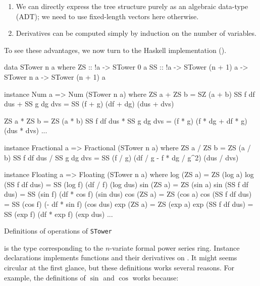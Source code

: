 \documentclass[./rims-smooth-paper.tex]{subfiles}
\begin{document}
\begin{enumerate}
\item We can directly express the tree structure purely as an algebraic data-type (ADT); we need to use fixed-length vectors here otherwise.\label{item:adt-friendly}
\item Derivatives can be computed simply by induction on the number of variables.\label{item:recurse}
\end{enumerate}

To see these advantages, we now turn to the Haskell implementation ().
\begin{listing}[tb]
\begin{code}
data STower n a where
  ZS :: !a -> STower 0 a
  SS :: !a -> STower (n + 1) a -> STower n a -> STower (n + 1) a

instance Num a => Num (STower n a) where
  ZS a + ZS b = SZ (a + b)
  SS f df dus + SS g dg dvs = SS (f + g) (df + dg) (dus + dvs)

  ZS a * ZS b = ZS (a * b)
  SS f df dus * SS g dg dvs = (f * g) (f * dg + df * g) (dus * dvs)
  ...

instance Fractional a => Fractional (STower n a) where
  ZS a / ZS b = ZS (a / b)
  SS f df dus / SS g dg dvs = SS (f / g) (df / g - f * dg / g^2) (dus / dvs)

instance Floating a => Floating (STower n a) where
  log (ZS a) = ZS (log a)
  log (SS f df dus) = SS (log f) (df / f) (log dus)
  sin (ZS a) = ZS (sin a)
  sin (SS f df dus) = SS (sin f) (df * cos f) (sin dus)
  cos (ZS a) = ZS (cos a)
  cos (SS f df dus) = SS (cos f) (- df * sin f) (cos dus)
  exp (ZS a) = ZS (exp a)
  exp (SS f df dus) = SS (exp f) (df * exp f) (exp dus)
  ...
\end{code}
\caption{Definitions of operations of \texttt{STower}\label{lst:ops-def}}
\end{listing}
 is the type corresponding to the $n$-variate formal power series ring.
Instance declarations implements functions and their derivatives on .
It might seems circular at the first glance, but these definitions works several reasons.
For example, the definitions of $\sin$ and $\cos$ works because:
\end{document}
